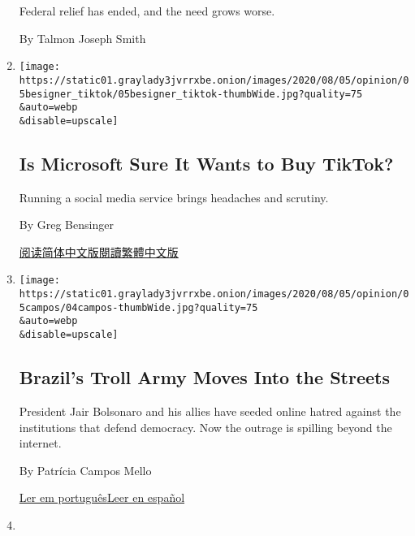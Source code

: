 \begin{enumerate}
  Federal relief has ended, and the need grows worse.

  By Talmon Joseph Smith
\item
  \href{/2020/08/04/opinion/tiktok-microsoft-trump.html}{}

  \texttt{[image: https://static01.graylady3jvrrxbe.onion/images/2020/08/05/opinion/05besigner\_tiktok/05besigner\_tiktok-thumbWide.jpg?quality=75\\\&auto=webp\\\&disable=upscale]}

  \hypertarget{is-microsoft-sure-it-wants-to-buy-tiktok}{%
  \subsection{Is Microsoft Sure It Wants to Buy
  TikTok?}\label{is-microsoft-sure-it-wants-to-buy-tiktok}}

  Running a social media service brings headaches and scrutiny.

  By Greg Bensinger

  \href{https://cn.nytimes3xbfgragh.onion/opinion/20200805/tiktok-microsoft-trump/}{阅读简体中文版}\href{https://cn.nytimes3xbfgragh.onion/opinion/20200805/tiktok-microsoft-trump/zh-hant/}{閱讀繁體中文版}
\item
  \href{/2020/08/04/opinion/bolsonaro-office-of-hate-brazil.html}{}

  \texttt{[image: https://static01.graylady3jvrrxbe.onion/images/2020/08/05/opinion/05campos/04campos-thumbWide.jpg?quality=75\\\&auto=webp\\\&disable=upscale]}

  \hypertarget{brazils-troll-army-moves-into-the-streets}{%
  \subsection{Brazil's Troll Army Moves Into the
  Streets}\label{brazils-troll-army-moves-into-the-streets}}

  President Jair Bolsonaro and his allies have seeded online hatred
  against the institutions that defend democracy. Now the outrage is
  spilling beyond the internet.

  By Patrícia Campos Mello

  \href{https://www.nytimes3xbfgragh.onion/pt/2020/08/04/opinion/international-world/bolsonaro-gabinete-do-odio.html}{Ler
  em
  português}\href{https://www.nytimes3xbfgragh.onion/es/2020/08/04/espanol/opinion/bolsonaro-oficina-odio-brasil.html}{Leer
  en español}
\item
  \href{/2020/08/04/opinion/covid-rural-hospitals.html}{}


\end{enumerate}
